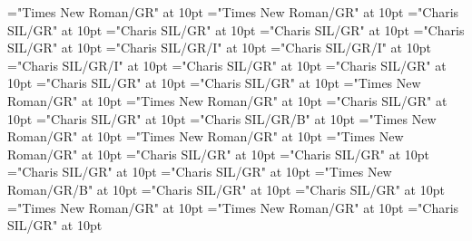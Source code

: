 \documentclass[a4paper,twoside]{article}
\begin{document}
\font\xitemptdefinitionLcptsensesensesentryletDatadicBody="Times New Roman/GR" at 10pt
\font\spanptxitemptdefinitionLcptsensesensesentryletDatadicBody="Times New Roman/GR" at 10pt
\font\spanendefinitionLcptsensesensesentryletDatadicBody="Charis SIL/GR" at 10pt
\font\xitemendefinitionLcptsensesensesentryletDatadicBody="Charis SIL/GR" at 10pt
\font\spanenxitemendefinitionLcptsensesensesentryletDatadicBody="Charis SIL/GR" at 10pt
\font\examplessensesensesentryletDatadicBody="Charis SIL/GR" at 10pt
\font\examplesehexamplessensesensesentryletDatadicBody="Charis SIL/GR/I" at 10pt
\font\spansehexamplesehexamplessensesensesentryletDatadicBody="Charis SIL/GR/I" at 10pt
\font\spanenexamplesehexamplessensesensesentryletDatadicBody="Charis SIL/GR/I" at 10pt
\font\spanenexamplessensesensesentryletDatadicBody="Charis SIL/GR" at 10pt
\font\variantrefsentryletDatadicBody="Charis SIL/GR" at 10pt
\font\spanenvariantrefsentryletDatadicBody="Charis SIL/GR" at 10pt
\font\variantrefentrytypevariantrefsentryletDatadicBody="Charis SIL/GR" at 10pt
\font\LexEntryTypepublishStemVariantTypeReverseAbbrPubptvariantrefentrytypevariantrefsentryletDatadicBody="Times New Roman/GR" at 10pt
\font\spanptLexEntryTypepublishStemVariantTypeReverseAbbrPubptvariantrefentrytypevariantrefsentryletDatadicBody="Times New Roman/GR" at 10pt
\font\spanenLexEntryTypepublishStemVariantTypeReverseAbbrPubptvariantrefentrytypevariantrefsentryletDatadicBody="Charis SIL/GR" at 10pt
\font\spanenvariantrefentrytypevariantrefsentryletDatadicBody="Charis SIL/GR" at 10pt
\font\variantrefformsehvariantrefsentryletDatadicBody="Charis SIL/GR/B" at 10pt
\font\pictureRightentryletDatadicBody="Times New Roman/GR" at 10pt
\font\picturepictureRightentryletDatadicBody="Times New Roman/GR" at 10pt
\font\pictureCaptionpictureRightentryletDatadicBody="Times New Roman/GR" at 10pt
\font\pictureSensepictureCaptionpictureRightentryletDatadicBody="Charis SIL/GR" at 10pt
\font\spanenpictureSensepictureCaptionpictureRightentryletDatadicBody="Charis SIL/GR" at 10pt
\font\pictureLabelsehpictureCaptionpictureRightentryletDatadicBody="Charis SIL/GR" at 10pt
\font\spansehpictureLabelsehpictureCaptionpictureRightentryletDatadicBody="Charis SIL/GR" at 10pt
\font\boldxsensenumbersensesensesentryletDatadicBody="Times New Roman/GR/B" at 10pt
\font\spanensensesentryletDatadicBody="Charis SIL/GR" at 10pt
\font\etymologyentryletDatadicBody="Charis SIL/GR" at 10pt
\font\etymologyformptetymologyentryletDatadicBody="Times New Roman/GR" at 10pt
\font\spanptetymologyformptetymologyentryletDatadicBody="Times New Roman/GR" at 10pt
\font\spanenetymologyformptetymologyentryletDatadicBody="Charis SIL/GR" at 10pt
\end{document}
